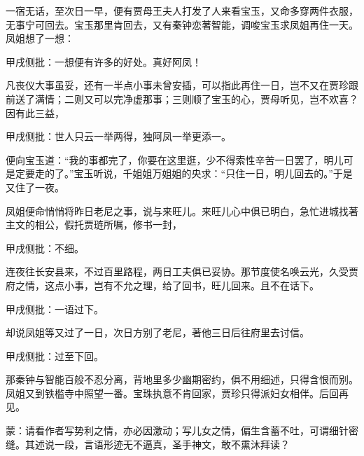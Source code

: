 \begin{parag}


    一宿无话，至次日一早，便有贾母王夫人打发了人来看宝玉，又命多穿两件衣服，无事宁可回去。宝玉那里肯回去，又有秦钟恋著智能，调唆宝玉求凤姐再住一天。凤姐想了一想：\begin{note}甲戌侧批：一想便有许多的好处。真好阿凤！\end{note}凡丧仪大事虽妥，还有一半点小事未曾安插，可以指此再住一日，岂不又在贾珍跟前送了满情；二则又可以完净虚那事；三则顺了宝玉的心，贾母听见，岂不欢喜？因有此三益，\begin{note}甲戌侧批：世人只云一举两得，独阿凤一举更添一。\end{note}便向宝玉道：“我的事都完了，你要在这里逛，少不得索性辛苦一日罢了，明儿可是定要走的了。”宝玉听说，千姐姐万姐姐的央求：“只住一日，明儿回去的。”于是又住了一夜。
\end{parag}


\begin{parag}


    凤姐便命悄悄将昨日老尼之事，说与来旺儿。来旺儿心中俱已明白，急忙进城找著主文的相公，假托贾琏所嘱，修书一封，\begin{note}甲戌侧批：不细。\end{note}连夜往长安县来，不过百里路程，两日工夫俱已妥协。那节度使名唤云光，久受贾府之情，这点小事，岂有不允之理，给了回书，旺儿回来。且不在话下。\begin{note}甲戌侧批：一语过下。\end{note}
\end{parag}


\begin{parag}


    却说凤姐等又过了一日，次日方别了老尼，著他三日后往府里去讨信。\begin{note}甲戌侧批：过至下回。\end{note}那秦钟与智能百般不忍分离，背地里多少幽期密约，俱不用细述，只得含恨而别。凤姐又到铁槛寺中照望一番。宝珠执意不肯回家，贾珍只得派妇女相伴。后回再见。
\end{parag}

\begin{parag}

    \begin{note}蒙：请看作者写势利之情，亦必因激动；写儿女之情，偏生含蓄不吐，可谓细针密缝。其述说一段，言语形迹无不逼真，圣手神文，敢不熏沐拜读？\end{note}
\end{parag}